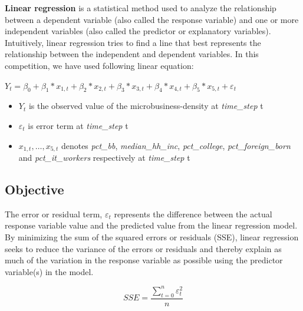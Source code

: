 \documentclass{article}
\begin{document}
\vspace{1em}
\textbf{Linear regression} is a statistical method used to analyze the relationship between a dependent variable  (also called the response variable)  and one or more independent variables (also called the predictor or explanatory variables). Intuitively, linear regression tries to find a line that best represents the relationship between the independent and dependent variables. In this competition, we have used following linear equation: 

\vspace{1em}
\begin{center}
\begin{tcolorbox}[colframe=orange,boxsep=5pt,boxrule=1pt,colback=white, width=0.7\linewidth]
$
Y_t = \beta_0  + \beta_1 * x_{1,t} + \beta_2 *  x_{2,t}  + \beta_3 * x_{3,t} +  \beta_4 * x_{4,t} + \beta_5 * x_{5,t} + \varepsilon_t 
$
\end{tcolorbox}
\end{center}

\vspace{1em}
\begin{itemize}
	\item $Y_t$ is the observed value of the microbusiness-density at \textit{time\_step} t
	\item $\varepsilon_t$ is error term at \textit{time\_step} t
	\item $x_{1,t}, \ldots , x_{5,t}$ denotes \textit{pct\_bb}, \textit{median\_hh\_inc}, \textit{pct\_college}, \textit{pct\_foreign\_born} and  \textit{pct\_it\_workers} respectively at \textit{time\_step} t
\end{itemize}
\vspace{1em}

\subsection{Objective}

The error or residual term, $\varepsilon_t$ represents the difference between the actual response variable value and the predicted value from the linear regression model. By minimizing the sum of the squared errors or residuals (SSE), linear regression seeks to reduce the variance of the errors or residuals and thereby explain as much of the variation in the response variable as possible using the predictor variable(s) in the model.

$$
	SSE = \frac{\sum_{t=0}^{n} \varepsilon_t^2}{n}
$$
\end{document}
